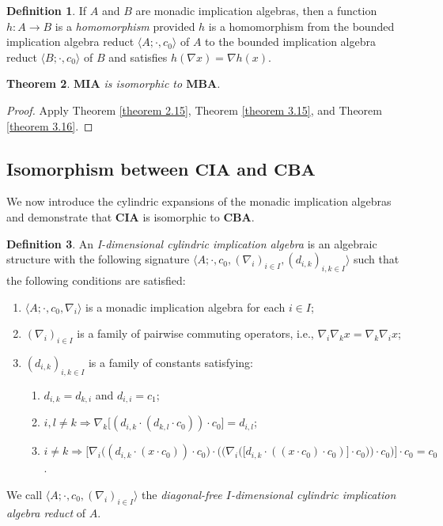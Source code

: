 \documentclass[reqno]{amsart}
\theoremstyle{plain}
\newtheorem{theorem}{Theorem}[section]
\theoremstyle{definition}
\newtheorem{definition}[theorem]{Definition}
\begin{document}
\begin{definition}
    If $A$ and $B$ are monadic implication algebras, then a function $h\colon A\to B$ is a \emph{homomorphism} provided $h$ is a homomorphism from the bounded implication algebra reduct $\langle A;\cdot,c_0\rangle$ of $A$ to the bounded implication algebra reduct $\langle B;\cdot,c_0\rangle$ of $B$ and satisfies $h(\nabla x)=\nabla h(x)$. 
\end{definition}

\begin{theorem}\label{theorem 3.18}
    $\mathbf{MIA}$ is isomorphic to $\mathbf{MBA}$. 
\end{theorem}
\begin{proof}
    Apply Theorem \ref{theorem 2.15}, Theorem \ref{theorem 3.15}, and Theorem \ref{theorem 3.16}. 
\end{proof}
\subsection{Isomorphism between $\mathbf{CIA}$ and $\mathbf{CBA}$}
We now introduce the cylindric expansions of the monadic implication algebras and demonstrate that $\mathbf{CIA}$ is isomorphic to $\mathbf{CBA}$.  
\begin{definition}\label{cia}
    An \emph{I-dimensional cylindric implication algebra} is an algebraic structure with the following signature $\langle A;\cdot,c_0,(\nabla_i)_{i\in I}, (d_{i,k})_{i,k\in I}\rangle$ such that the following conditions are satisfied: 
    \begin{enumerate}
        \item $\langle A;\cdot,c_0,\nabla_i\rangle$ is a monadic implication algebra for each $i\in I$; 
        \item $(\nabla_i)_{i\in I}$ is a family of pairwise commuting operators, i.e., $\nabla _i\nabla_kx=\nabla_k\nabla_ix$; 
        \item $(d_{i,k})_{i,k\in I}$ is a family of constants satisfying: 
        \begin{enumerate}
            \item $d_{i,k}=d_{k,i}$ and $d_{i,i}=c_1$; 
            \item $i,l\not=k\Rightarrow\nabla_{k}\bigl[(d_{i,k}\cdot (d_{k,l}\cdot c_0))\cdot c_0\bigl]=d_{i,l}$; 
            \item $i\not=k\Rightarrow\biggl[\nabla_i\biggl((d_{i,k}\cdot(x\cdot c_0))\cdot c_0\biggl)\cdot\biggl(\biggl(\nabla_i\biggl(\bigl[d_{i,k}\cdot((x\cdot c_0)\cdot c_0)\bigl]\cdot c_0\biggl)\biggl)\cdot c_0\biggl)\biggl]\cdot c_0=c_0$.
        \end{enumerate}
    \end{enumerate}
    We call $\langle A;\cdot,c_0,(\nabla_i)_{i\in I}\rangle$ the \emph{diagonal-free $I$-dimensional cylindric implication algebra reduct} of $A$. 
\end{definition}
 
\end{document}
